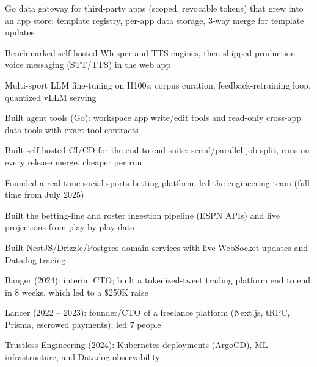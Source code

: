 \documentclass[print]{jack-resume}
\begin{document}
\begin{tightemize}
    \item Go data gateway for third-party apps (scoped, revocable tokens) that grew into an app store: template registry, per-app data storage, 3-way merge for template updates
    \item Benchmarked self-hosted Whisper and TTS engines, then shipped production voice messaging (STT/TTS) in the web app
    \item Multi-sport LLM fine-tuning on H100s: corpus curation, feedback-retraining loop, quantized vLLM serving
    \item Built agent tools (Go): workspace app write/edit tools and read-only cross-app data tools with exact tool contracts
    \item Built self-hosted CI/CD for the end-to-end suite: serial/parallel job split, runs on every release merge, cheaper per run
\end{tightemize}
\sectionsep

\begin{tightemize}
    \item Founded a real-time social sports betting platform; led the engineering team (full-time from July 2025)
    \item Built the betting-line and roster ingestion pipeline (ESPN APIs) and live projections from play-by-play data
    \item Built NestJS/Drizzle/Postgres domain services with live WebSocket updates and Datadog tracing
\end{tightemize}
\sectionsep

\begin{tightemize}
    \item Banger (2024): interim CTO; built a tokenized-tweet trading platform end to end in 8 weeks, which led to a \$250K raise
    \item Lancer (2022 -- 2023): founder/CTO of a freelance platform (Next.js, tRPC, Prisma, escrowed payments); led 7 people
    \item Trustless Engineering (2024): Kubernetes deployments (ArgoCD), ML infrastructure, and Datadog observability
\end{tightemize}
\sectionsep
\end{document}
